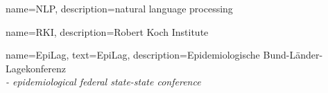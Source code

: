\RequirePackage[square]{natbib}




\RequirePackage{amsthm}
\theoremstyle{definition}
\newtheorem{definition}{Definition}[chapter]
\newtheorem{example}{Example}[chapter]




\RequirePackage[small,bf]{caption}




\RequirePackage{subfig}





\graphicspath{{./Figures/}}









{
  name={NLP},
  description={natural language processing}
}

{
  name={RKI},
  description={Robert Koch Institute}
}

{
  name={EpiLag},
  text={EpiLag},
  description={Epidemiologische Bund-L\"ander-Lagekonferenz \\
               \textit{- epidemiological federal state-state conference}}
}

